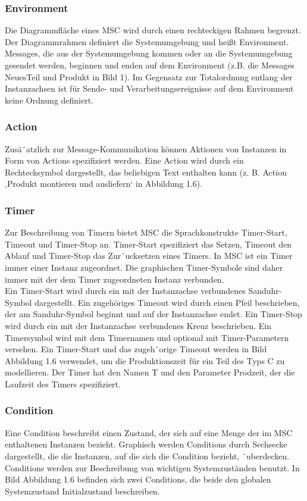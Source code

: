 \subsubsection{Environment}
Die Diagrammfläche eines MSC wird durch einen rechteckigen
Rahmen begrenzt. Der Diagrammrahmen definiert
die Systemumgebung und heißt Environment. Messages,
die aus der Systemumgebung kommen oder an die Systemumgebung
gesendet werden, beginnen und enden auf
dem Environment (z.B. die Messages NeuesTeil und
Produkt in Bild 1). Im Gegensatz zur Totalordnung entlang
der Instanzachsen ist für Sende- und Verarbeitungsereignisse
auf dem Environment keine Ordnung definiert.\\
\subsubsection{Action}
Zusä¨atzlich zur Message-Kommunikation können Aktionen
von Instanzen in Form von Actions spezifiziert werden.
Eine Action wird durch ein Rechtecksymbol dargestellt, das
beliebigen Text enthalten kann (z. B. Action ,Produkt
montieren und ausliefern‘ in Abbildung 1.6).\\
\subsubsection{Timer}
Zur Beschreibung von Timern bietet MSC die Sprachkonstrukte
Timer-Start, Timeout und Timer-Stop an. Timer-Start
spezifiziert das Setzen, Timeout den Ablauf und Timer-Stop das Zur¨ucksetzen eines Timers. In MSC ist ein Timer
immer einer Instanz zugeordnet. Die graphischen Timer-Symbole sind daher immer mit der dem Timer zugeordneten
Instanz verbunden.\\

Ein Timer-Start wird durch ein mit der Instanzachse
verbundenes Sanduhr-Symbol dargestellt. Ein zugehöriges
Timeout wird durch einen Pfeil beschrieben, der am
Sanduhr-Symbol beginnt und auf der Instanzachse endet.
Ein Timer-Stop wird durch ein mit der Instanzachse verbundenes
Kreuz beschrieben. Ein Timersymbol wird mit
dem Timernamen und optional mit Timer-Parametern versehen.
Ein Timer-Start und das zugeh¨orige Timeout werden
in Bild Abbildung 1.6 verwendet, um die Produktionszeit für ein Teil des
Typs C zu modellieren. Der Timer hat den Namen T und
den Parameter Prodzeit, der die Laufzeit des Timers
spezifiziert.\\
\subsubsection{Condition}
Eine Condition beschreibt einen Zustand, der sich auf
eine Menge der im MSC enthaltenen Instanzen bezieht.
Graphisch werden Conditions durch Sechsecke dargestellt,
die die Instanzen, auf die sich die Condition bezieht,
¨uberdecken. Conditions werden zur Beschreibung von
wichtigen Systemzuständen benutzt. In Bild Abbildung 1.6 befinden sich
zwei Conditions, die beide den globalen Systemzustand
Initialzustand beschreiben.\\
